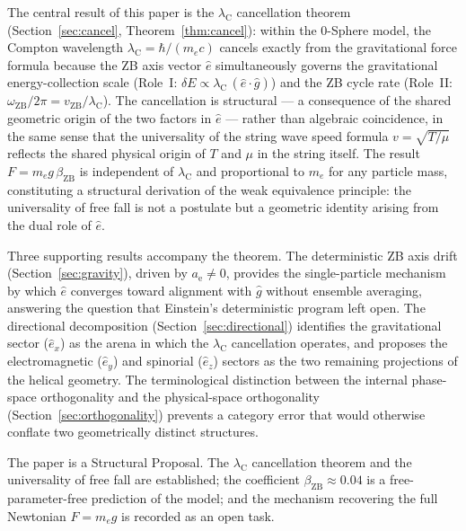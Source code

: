 \documentclass[%
 reprint, amsmath,amssymb, aps, prb, ]{revtex4-2}
\numberwithin{equation}{section}
\newcommand{\omZB}{\omega_{\text{ZB}}}
\newcommand{\lambdaC}{\lambda_{\mathrm{C}}}
\newcommand{\betaZB}{\beta_{\mathrm{ZB}}}
\newcommand{\vZB}{v_{\mathrm{ZB}}}
\newcommand{\anom}{a_{\mathrm{e}}}
\newcommand{\ehat}[1]{\hat{e}_{#1}}
\begin{document}
The central result of this paper is the $\lambdaC$ cancellation theorem (Section~\ref{sec:cancel}, Theorem~\ref{thm:cancel}): within the 0-Sphere model, the Compton wavelength $\lambdaC = \hbar/(m_e c)$ cancels exactly from the gravitational force formula because the ZB axis vector $\hat{e}$ simultaneously governs the gravitational energy-collection scale (Role~I: $\delta E \propto \lambdaC\,(\hat{e}\cdot\hat{g})$) and the ZB cycle rate (Role~II: $\omZB/2\pi = \vZB/\lambdaC$).
The cancellation is structural --- a consequence of the shared geometric origin of the two factors in $\hat{e}$ --- rather than algebraic coincidence, in the same sense that the universality of the string wave speed formula $v = \sqrt{T/\mu}$ reflects the shared physical origin of $T$ and $\mu$ in the string itself.
The result $F = m_e g\,\betaZB$ is independent of $\lambdaC$ and proportional to $m_e$ for any particle mass, constituting a structural derivation of the weak equivalence principle: the universality of free fall is not a postulate but a geometric identity arising from the dual role of $\hat{e}$.

Three supporting results accompany the theorem.
The deterministic ZB axis drift (Section~\ref{sec:gravity}), driven by $\anom \neq 0$, provides the single-particle mechanism by which $\hat{e}$ converges toward alignment with $\hat{g}$ without ensemble averaging, answering the question that Einstein's deterministic program left open.
The directional decomposition (Section~\ref{sec:directional}) identifies the gravitational sector ($\ehat{x}$) as the arena in which the $\lambdaC$ cancellation operates, and proposes the electromagnetic ($\ehat{y}$) and spinorial ($\ehat{z}$) sectors as the two remaining projections of the helical geometry.
The terminological distinction between the internal phase-space orthogonality and the physical-space orthogonality (Section~\ref{sec:orthogonality}) prevents a category error that would otherwise conflate two geometrically distinct structures.

The paper is a Structural Proposal.
The $\lambdaC$ cancellation theorem and the universality of free fall are established; the coefficient $\betaZB \approx 0.04$ is a free-parameter-free prediction of the model; and the mechanism recovering the full Newtonian $F = m_e g$ is recorded as an open task.
\end{document}
